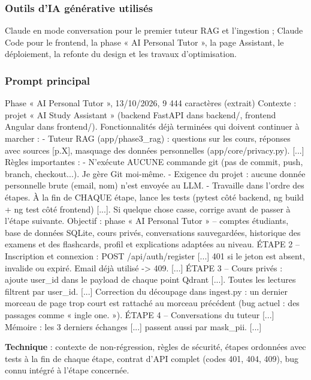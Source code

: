 \documentclass[12pt,a4paper]{report}
\begin{document}
\subsubsection{Outils d'IA générative utilisés}
Claude en mode conversation pour le premier tuteur RAG et l'ingestion ; Claude Code pour le frontend, la
phase « AI Personal Tutor », la page Assistant, le déploiement, la refonte du design et les travaux
d'optimisation.

\subsubsection{Prompt principal}
\begin{prompt}{Phase « AI Personal Tutor », 13/10/2026, 9 444 caractères (extrait)}
Contexte : projet « AI Study Assistant » (backend FastAPI dans backend/, frontend Angular dans
frontend/). Fonctionnalités déjà terminées qui doivent continuer à marcher :
- Tuteur RAG (app/phase3_rag) : questions sur les cours, réponses avec sources [p.X], masquage des
  données personnelles (app/core/privacy.py). [...]
Règles importantes :
- N'exécute AUCUNE commande git (pas de commit, push, branch, checkout...). Je gère Git moi-même.
- Exigence du projet : aucune donnée personnelle brute (email, nom) n'est envoyée au LLM.
- Travaille dans l'ordre des étapes. À la fin de CHAQUE étape, lance les tests (pytest côté
  backend, ng build + ng test côté frontend) [...]. Si quelque chose casse, corrige avant de passer
  à l'étape suivante.
Objectif : phase « AI Personal Tutor » -- comptes étudiants, base de données SQLite, cours privés,
conversations sauvegardées, historique des examens et des flashcards, profil et explications
adaptées au niveau.
ÉTAPE 2 -- Inscription et connexion : POST /api/auth/register [...] 401 si le jeton est absent,
invalide ou expiré. Email déjà utilisé -> 409. [...]
ÉTAPE 3 -- Cours privés : ajoute user_id dans le payload de chaque point Qdrant [...]. Toutes les
lectures filtrent par user_id. [...] Correction du découpage dans ingest.py : un dernier morceau de
page trop court est rattaché au morceau précédent (bug actuel : des passages comme « ingle one. »).
ÉTAPE 4 -- Conversations du tuteur [...] Mémoire : les 3 derniers échanges [...] passent aussi par
mask_pii. [...]
\end{prompt}
\textbf{Technique} : contexte de non-régression, règles de sécurité, étapes ordonnées avec tests à la fin
de chaque étape, contrat d'API complet (codes 401, 404, 409), bug connu intégré à l'étape concernée.
\end{document}

